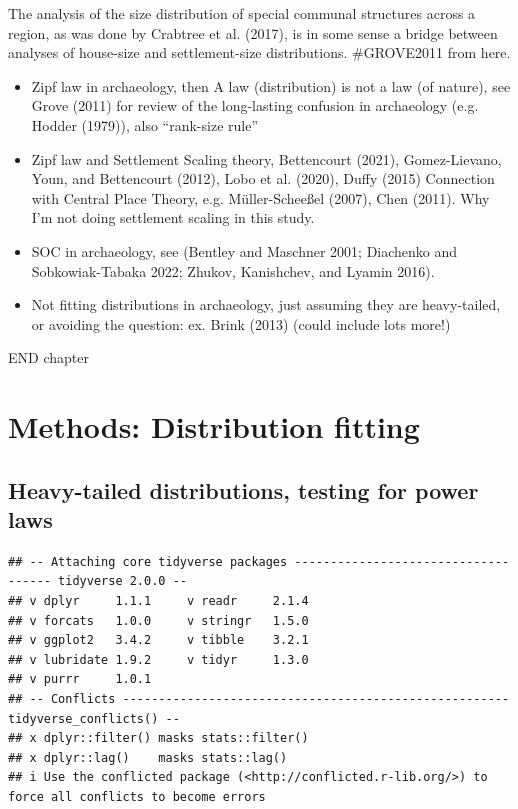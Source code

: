 \documentclass[
  12pt,
]{book}
\begin{document}
The analysis of the size distribution of special communal structures across a region, as was done by Crabtree et al. (2017), is in some sense a bridge between analyses of house-size and settlement-size distributions. \#GROVE2011 from here.

\begin{itemize}
\item
  Zipf law in archaeology, then A law (distribution) is not a law (of nature), see Grove (2011) for review of the long-lasting confusion in archaeology (e.g. Hodder (1979)), also ``rank-size rule''
\item
  Zipf law and Settlement Scaling theory, Bettencourt (2021), Gomez-Lievano, Youn, and Bettencourt (2012), Lobo et al. (2020), Duffy (2015) Connection with Central Place Theory, e.g. Müller-Scheeßel (2007), Chen (2011). Why I'm not doing settlement scaling in this study.
\item
  SOC in archaeology, see (Bentley and Maschner 2001; Diachenko and Sobkowiak-Tabaka 2022; Zhukov, Kanishchev, and Lyamin 2016).
\item
  Not fitting distributions in archaeology, just assuming they are heavy-tailed, or avoiding the question: ex. Brink (2013) (could include lots more!)
\end{itemize}

END chapter

\hypertarget{methods-distfit}{%
\chapter{Methods: Distribution fitting}\label{methods-distfit}}

\hypertarget{heavy-tailed-distributions-testing-for-power-laws}{%
\section{Heavy-tailed distributions, testing for power laws}\label{heavy-tailed-distributions-testing-for-power-laws}}

\begin{verbatim}
## -- Attaching core tidyverse packages ------------------------------------ tidyverse 2.0.0 --
## v dplyr     1.1.1     v readr     2.1.4
## v forcats   1.0.0     v stringr   1.5.0
## v ggplot2   3.4.2     v tibble    3.2.1
## v lubridate 1.9.2     v tidyr     1.3.0
## v purrr     1.0.1     
## -- Conflicts ------------------------------------------------------ tidyverse_conflicts() --
## x dplyr::filter() masks stats::filter()
## x dplyr::lag()    masks stats::lag()
## i Use the conflicted package (<http://conflicted.r-lib.org/>) to force all conflicts to become errors
\end{verbatim}
\end{document}

